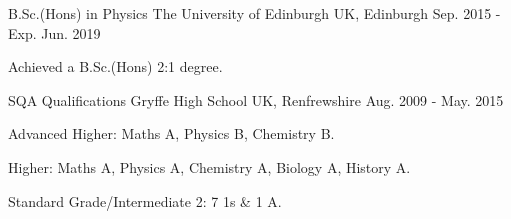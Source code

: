 

\begin{cventries}

  \cventry
    {B.Sc.(Hons) in Physics} %
    {The University of Edinburgh} %
    {UK, Edinburgh} %
    {Sep. 2015 - Exp. Jun. 2019} %
    {
      \begin{cvitems} %
        \item {Achieved a B.Sc.(Hons) 2:1 degree.}
      \end{cvitems}
    }
    
  \cventry
    {SQA Qualifications} %
    {Gryffe High School} %
    {UK, Renfrewshire} %
    {Aug. 2009 - May. 2015} %
    {
      \begin{cvitems} %
        \item {Advanced Higher: Maths A, Physics B, Chemistry B.}
        \item {Higher: Maths A, Physics A, Chemistry A, Biology A, History A.}
        \item {Standard Grade/Intermediate 2: 7 1s \& 1 A.}
      \end{cvitems}
    }

\end{cventries}
